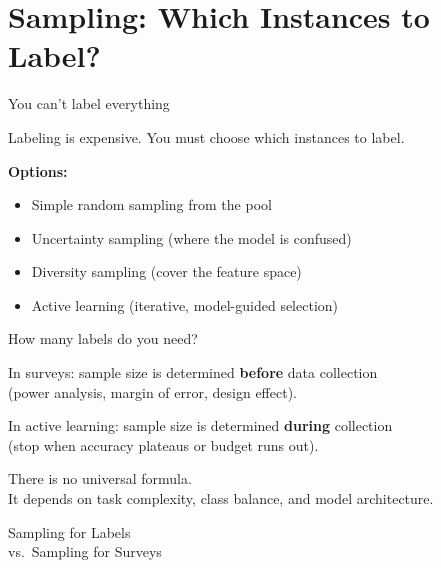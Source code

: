 \documentclass[aspectratio=169,11pt]{beamer}
\begin{document}
\section{Sampling: Which Instances to Label?}

\begin{frame}{You can't label everything}

Labeling is expensive. You must choose which instances to label.

\vspace{1em}

\textbf{Options:}
\begin{itemize}
  \item Simple random sampling from the pool
  \item Uncertainty sampling (where the model is confused)
  \item Diversity sampling (cover the feature space)
  \item Active learning (iterative, model-guided selection)
\end{itemize}

\vspace{1em}

\hfill \citep{monarch2021human}
\end{frame}

\begin{frame}{How many labels do you need?}

In surveys: sample size is determined \textbf{before} data collection\\
(power analysis, margin of error, design effect).

\vspace{1em}

In active learning: sample size is determined \textbf{during} collection\\
(stop when accuracy plateaus or budget runs out).

\vspace{1em}

There is no universal formula.\\
It depends on task complexity, class balance, and model architecture.
\end{frame}

\begin{frame}[standout]
Sampling for Labels\\vs.\ Sampling for Surveys
\end{frame}
\end{document}
